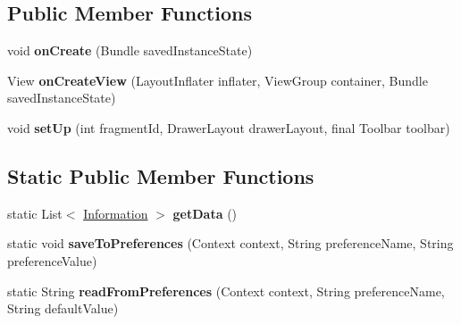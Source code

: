 \subsection*{Public Member Functions}
\begin{DoxyCompactItemize}
\item 
\hypertarget{classantardhvani_1_1du_1_1ac_1_1in_1_1antardhvani_1_1_navigation_drawer_fragment_aac1d326dddf926fb2e161b38c359f843}{}void {\bfseries on\+Create} (Bundle saved\+Instance\+State)\label{classantardhvani_1_1du_1_1ac_1_1in_1_1antardhvani_1_1_navigation_drawer_fragment_aac1d326dddf926fb2e161b38c359f843}

\item 
\hypertarget{classantardhvani_1_1du_1_1ac_1_1in_1_1antardhvani_1_1_navigation_drawer_fragment_a3b56d0fdc63cbd61029cb995e2f2a06f}{}View {\bfseries on\+Create\+View} (Layout\+Inflater inflater, View\+Group container, Bundle saved\+Instance\+State)\label{classantardhvani_1_1du_1_1ac_1_1in_1_1antardhvani_1_1_navigation_drawer_fragment_a3b56d0fdc63cbd61029cb995e2f2a06f}

\item 
\hypertarget{classantardhvani_1_1du_1_1ac_1_1in_1_1antardhvani_1_1_navigation_drawer_fragment_a5b0cf2f646e8cab2f95815155ddd6bce}{}void {\bfseries set\+Up} (int fragment\+Id, Drawer\+Layout drawer\+Layout, final Toolbar toolbar)\label{classantardhvani_1_1du_1_1ac_1_1in_1_1antardhvani_1_1_navigation_drawer_fragment_a5b0cf2f646e8cab2f95815155ddd6bce}

\end{DoxyCompactItemize}
\subsection*{Static Public Member Functions}
\begin{DoxyCompactItemize}
\item 
\hypertarget{classantardhvani_1_1du_1_1ac_1_1in_1_1antardhvani_1_1_navigation_drawer_fragment_ace4679e55dc40bc3eb9d55f840eaf5fd}{}static List$<$ \hyperlink{classantardhvani_1_1du_1_1ac_1_1in_1_1antardhvani_1_1_information}{Information} $>$ {\bfseries get\+Data} ()\label{classantardhvani_1_1du_1_1ac_1_1in_1_1antardhvani_1_1_navigation_drawer_fragment_ace4679e55dc40bc3eb9d55f840eaf5fd}

\item 
\hypertarget{classantardhvani_1_1du_1_1ac_1_1in_1_1antardhvani_1_1_navigation_drawer_fragment_a6aed9cfc3d59b5a225ab20333e4a1ead}{}static void {\bfseries save\+To\+Preferences} (Context context, String preference\+Name, String preference\+Value)\label{classantardhvani_1_1du_1_1ac_1_1in_1_1antardhvani_1_1_navigation_drawer_fragment_a6aed9cfc3d59b5a225ab20333e4a1ead}

\item 
\hypertarget{classantardhvani_1_1du_1_1ac_1_1in_1_1antardhvani_1_1_navigation_drawer_fragment_acd76e50c3cb1a41f980fd99b98680bb5}{}static String {\bfseries read\+From\+Preferences} (Context context, String preference\+Name, String default\+Value)\label{classantardhvani_1_1du_1_1ac_1_1in_1_1antardhvani_1_1_navigation_drawer_fragment_acd76e50c3cb1a41f980fd99b98680bb5}

\end{DoxyCompactItemize}
